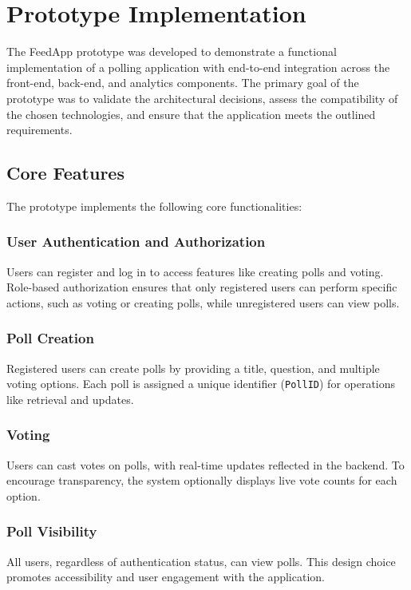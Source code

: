 \section{Prototype Implementation}
\label{sec:implementation}

The FeedApp prototype was developed to demonstrate a functional implementation of a polling application with end-to-end integration across the front-end, back-end, and analytics components. The primary goal of the prototype was to validate the architectural decisions, assess the compatibility of the chosen technologies, and ensure that the application meets the outlined requirements.

\subsection{Core Features}
The prototype implements the following core functionalities:
\subsubsection{User Authentication and Authorization}
Users can register and log in to access features like creating polls and voting. Role-based authorization ensures that only registered users can perform specific actions, such as voting or creating polls, while unregistered users can view polls.

\subsubsection{Poll Creation}
Registered users can create polls by providing a title, question, and multiple voting options. Each poll is assigned a unique identifier (\texttt{PollID}) for operations like retrieval and updates.

\subsubsection{Voting}
Users can cast votes on polls, with real-time updates reflected in the backend. To encourage transparency, the system optionally displays live vote counts for each option.

\subsubsection{Poll Visibility}
All users, regardless of authentication status, can view polls. This design choice promotes accessibility and user engagement with the application.

